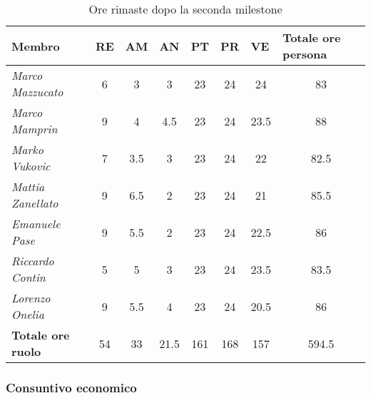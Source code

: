 \begin{table}[H]
    \centering
    \begin{tabular}{|l|c|c|c|c|c|c|c|}
    \hline
    \textbf{Membro} & \multicolumn{1}{l|}{\textbf{RE}} & \multicolumn{1}{l|}{\textbf{AM}} & \multicolumn{1}{l|}{\textbf{AN}} & \multicolumn{1}{l|}{\textbf{PT}} & \multicolumn{1}{l|}{\textbf{PR}} & \multicolumn{1}{l|}{\textbf{VE}} & \multicolumn{1}{l|}{\textbf{Totale ore persona}} \\ \hline
    \textit{Marco Mazzucato}  & 6  & 3    & 3    & 23  & 24 & 24     & 83     \\ \hline
    \textit{Marco Mamprin}    & 9  & 4    & 4.5  & 23  & 24 & 23.5   & 88     \\ \hline
    \textit{Marko Vukovic}    & 7  & 3.5  & 3    & 23  & 24 & 22     & 82.5   \\ \hline
    \textit{Mattia Zanellato} & 9  & 6.5  & 2    & 23  & 24 & 21     & 85.5   \\ \hline
    \textit{Emanuele Pase}    & 9  & 5.5  & 2    & 23  & 24 & 22.5   & 86     \\ \hline
    \textit{Riccardo Contin}  & 5  & 5    & 3    & 23  & 24 & 23.5   & 83.5   \\ \hline
    \textit{Lorenzo Onelia}   & 9  & 5.5  & 4    & 23  & 24 & 20.5   & 86     \\ \hline
    \textbf{Totale ore ruolo} & 54 & 33   & 21.5 & 161 & 168& 157    & 594.5  \\ \hline
    \end{tabular}
    \caption{Ore rimaste dopo la seconda milestone}
\end{table}

\subsubsection{Consuntivo economico}

